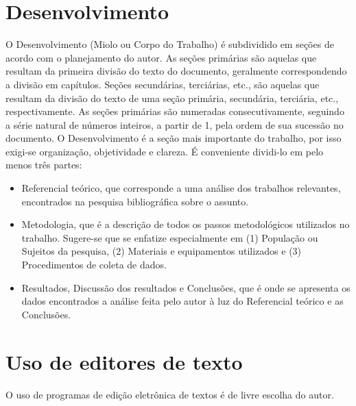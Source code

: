 \section{Desenvolvimento}
O Desenvolvimento (Miolo ou Corpo do Trabalho) é subdividido em seções de
acordo com o planejamento do autor. As seções primárias são aquelas que
resultam da primeira divisão do texto do documento, geralmente
correspondendo a divisão em capítulos. Seções secundárias, terciárias,
etc., são aquelas que resultam da divisão do texto de uma seção primária,
secundária, terciária, etc., respectivamente.
As seções primárias são numeradas consecutivamente, seguindo a série
natural de números inteiros, a partir de 1, pela ordem de sua sucessão no
documento.
O Desenvolvimento é a seção mais importante do trabalho, por isso exigi-se
organização, objetividade e clareza. É conveniente dividi-lo em pelo menos
três partes:
\begin{itemize}
\item Referencial teórico, que corresponde a uma análise dos trabalhos
relevantes, encontrados na pesquisa bibliográfica sobre o assunto.
\item Metodologia, que é a descrição de todos os passos metodológicos
utilizados no trabalho. Sugere-se que se enfatize especialmente em (1)
População ou Sujeitos da pesquisa, (2) Materiais e equipamentos
utilizados e (3) Procedimentos de coleta de dados.
\item Resultados, Discussão dos resultados e Conclusões, que é onde se
apresenta os dados encontrados a análise feita pelo autor à luz do
Referencial teórico e as Conclusões.
\end{itemize}
\section{Uso de editores de texto}
O uso de programas de edição eletrônica de textos é de livre escolha do autor. 